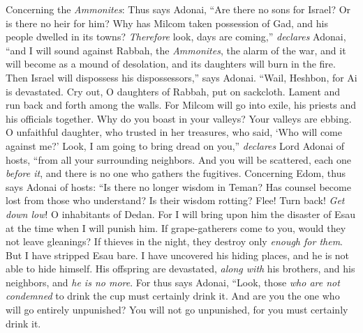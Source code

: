\begin{biblechapter} %
 Concerning the \textit{Ammonites}: Thus says Adonai,
\verse “Are there no sons for Israel? 
Or is there no heir for him? 
Why has Milcom taken possession of Gad, 
and his people dwelled in its towns?
\verse \textit{Therefore} look, days are coming,” \textit{declares} Adonai, 
“and I will sound against Rabbah, the \textit{Ammonites}, 
the alarm of the war, 
and it will become as a mound of desolation, 
and its daughters will burn in the fire. 
Then Israel will dispossess his dispossessors,” says Adonai.
\verse “Wail, Heshbon, for Ai is devastated. 
Cry out, O daughters of Rabbah, put on sackcloth. 
Lament and run back and forth among the walls. 
For Milcom will go into exile, 
his priests and his officials together.
\verse Why do you boast in your valleys? 
Your valleys are ebbing. 
O unfaithful daughter, who trusted in her treasures, 
who said, ‘Who will come against me?’
\verse Look, I am going to bring dread on you,” 
\textit{declares} Lord Adonai of hosts, 
“from all your surrounding neighbors. 
And you will be scattered, 
each one \textit{before it}, 
and there is no one who gathers the fugitives.
 Concerning Edom, thus says Adonai of hosts:
\verse “Is there no longer wisdom in Teman? 
Has counsel become lost from those who understand? 
Is their wisdom rotting?
\verse Flee! Turn back! \textit{Get down low}! 
O inhabitants of Dedan. 
For I will bring upon him the disaster of Esau 
at the time when I will punish him.
\verse If grape-gatherers come to you, 
would they not leave gleanings? 
If thieves in the night, 
they destroy only \textit{enough for them}.
\verse But I have stripped Esau bare. 
I have uncovered his hiding places, 
and he is not able to hide himself. 
His offspring are devastated, \textit{along with} his brothers, 
and his neighbors, and \textit{he is no more}.
\verse For thus says Adonai, “Look, those \textit{who are not condemned} to drink the cup must certainly drink it. And are you the one who will go entirely unpunished? You will not go unpunished, for you must certainly drink it.

\end{biblechapter}
